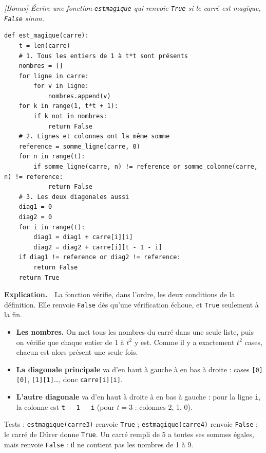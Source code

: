 \documentclass[addpoints, 11pt]{exam}
\newcommand{\enonce}[1]{\textit{#1}\par\smallskip}
\newcommand{\explication}{\par\smallskip\noindent\textbf{Explication.}\ }
\newcommand{\code}[1]{\texttt{#1}}
\DeclareRobustCommand{\_}{\textunderscore\allowbreak}
\begin{document}
\begin{questions}
\question[2] \enonce{[Bonus] Écrire une fonction \code{est\_magique} qui renvoie \code{True} si le carré est magique, \code{False} sinon.}
\begin{reponse}
\begin{lstlisting}
def est_magique(carre):
    t = len(carre)
    # 1. Tous les entiers de 1 à t*t sont présents
    nombres = []
    for ligne in carre:
        for v in ligne:
            nombres.append(v)
    for k in range(1, t*t + 1):
        if k not in nombres:
            return False
    # 2. Lignes et colonnes ont la même somme
    reference = somme_ligne(carre, 0)
    for n in range(t):
        if somme_ligne(carre, n) != reference or somme_colonne(carre, n) != reference:
            return False
    # 3. Les deux diagonales aussi
    diag1 = 0
    diag2 = 0
    for i in range(t):
        diag1 = diag1 + carre[i][i]
        diag2 = diag2 + carre[i][t - 1 - i]
    if diag1 != reference or diag2 != reference:
        return False
    return True
\end{lstlisting}
\end{reponse}
\explication\ La fonction vérifie, dans l'ordre, les deux conditions de la définition. Elle renvoie \code{False} dès qu'une vérification échoue, et \code{True} seulement à la fin.
\begin{itemize}
  \item \textbf{Les nombres.} On met tous les nombres du carré dans une seule liste, puis on vérifie que chaque entier de 1 à $t^2$ y est. Comme il y a exactement $t^2$ cases, chacun est alors présent une seule fois.
  \item \textbf{La diagonale principale} va d'en haut à gauche à en bas à droite : cases \code{[0][0]}, \code{[1][1]}\dots, donc \code{carre[i][i]}.
  \item \textbf{L'autre diagonale} va d'en haut à droite à en bas à gauche : pour la ligne \code{i}, la colonne est \code{t - 1 - i} (pour $t = 3$ : colonnes 2, 1, 0).
\end{itemize}
Tests : \code{est\_magique(carre3)} renvoie \code{True} ; \code{est\_magique(carre4)} renvoie \code{False} ; le carré de Dürer donne \code{True}. Un carré rempli de 5 a toutes ses sommes égales, mais renvoie \code{False} : il ne contient pas les nombres de 1 à 9.

\end{questions}
\end{document}
